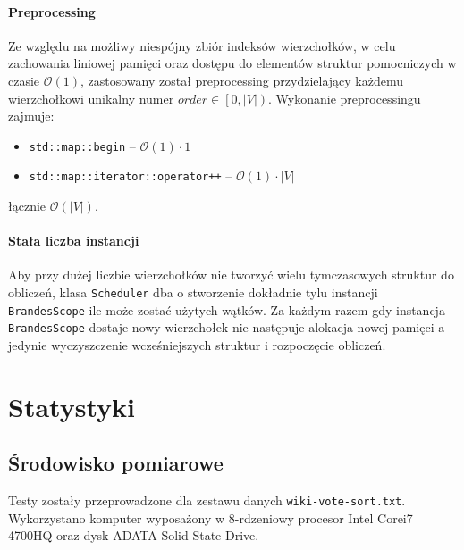 \documentclass{article}
\begin{document}
      \paragraph{Preprocessing} Ze względu na możliwy niespójny zbiór indeksów
      wierzchołków, w celu zachowania liniowej pamięci oraz dostępu do elementów
      struktur pomocniczych w czasie $\mathcal{O}(1)$, zastosowany został
      preprocessing przydzielający każdemu wierzchołkowi unikalny numer
      $order \in \left[0, |V|\right)$. Wykonanie preprocessingu zajmuje:
      \begin{itemize}[noitemsep]
        \item \texttt{std::map::begin} -- $\mathcal{O}(1)\cdot1$
        \item \texttt{std::map::iterator::operator++} -- $\mathcal{O}(1)\cdot|V|$
      \end{itemize}
      łącznie $\mathcal{O}(|V|)$.

      \paragraph{Stała liczba instancji} Aby przy dużej liczbie wierzchołków nie
      tworzyć wielu tymczasowych struktur do obliczeń, klasa \texttt{Scheduler} dba o
      stworzenie dokładnie tylu instancji \texttt{BrandesScope} ile może zostać
      użytych wątków. Za każdym razem gdy instancja \texttt{BrandesScope} dostaje
      nowy wierzchołek nie następuje alokacja nowej pamięci a jedynie wyczyszczenie
      wcześniejszych struktur i rozpoczęcie obliczeń.

  \newpage
  \section{Statystyki}
    \subsection{Środowisko pomiarowe}
    Testy zostały przeprowadzone dla zestawu danych \texttt{wiki-vote-sort.txt}.
    Wykorzystano komputer wyposażony w 8-rdzeniowy procesor Intel\textsuperscript{
    \textregistered} Core\texttrademark i7 4700HQ oraz dysk ADATA\textsuperscript{
    \textregistered} Solid State Drive.
\end{document}
